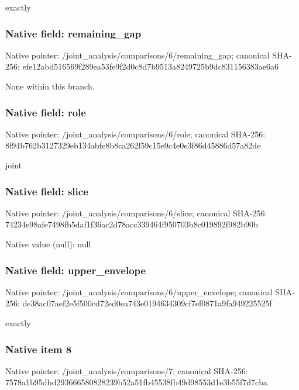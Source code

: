 \documentclass[10pt,a4paper]{article}
\begin{document}
\begingroup\raggedright{} exactly\par\endgroup

\subsubsection{Native field: remaining\_\allowbreak{}gap}
Native pointer: /joint\_\allowbreak{}analysis/comparisons/6/remaining\_\allowbreak{}gap; canonical SHA-256: efe12abd516569f289ea53fe9f2d0c8d7b9513a8249725b9dc831156383ae6a6

\begingroup\raggedright\sloppy None within this branch.\par\endgroup

\subsubsection{Native field: role}
Native pointer: /joint\_\allowbreak{}analysis/comparisons/6/role; canonical SHA-256: 8f94b762b3127329eb134abfe8b8ca262f59c15e9c4e0e3f86d45886d57a82de

\begingroup\raggedright\sloppy joint\par\endgroup

\subsubsection{Native field: slice}
Native pointer: /joint\_\allowbreak{}analysis/comparisons/6/slice; canonical SHA-256: 74234e98afe7498fb5daf1f36ac2d78acc339464f950703b8c019892f982b90b

Native value (null): null

\subsubsection{Native field: upper\_\allowbreak{}envelope}
Native pointer: /joint\_\allowbreak{}analysis/comparisons/6/upper\_\allowbreak{}envelope; canonical SHA-256: de38ac07aef2e5f500cd72ed0ea743e0194634309cf7ef0871a9fa949225525f

\begingroup\raggedright{} exactly\par\endgroup

\subsubsection{Native item 8}
Native pointer: /joint\_\allowbreak{}analysis/comparisons/7; canonical SHA-256: 7578a1b95dbd293666580828239b52a51fb45538fb49d98553d1e3b55f7d7cba
\end{document}
